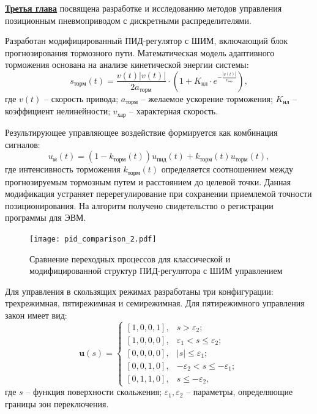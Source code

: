 \underline{\textbf{Третья глава}}
посвящена разработке и исследованию методов управления позиционным
пневмоприводом с дискретными распределителями.

Разработан модифицированный ПИД-регулятор с ШИМ, включающий блок прогнозирования
тормозного пути. Математическая модель адаптивного торможения основана на анализе кинетической энергии системы:
\begin{equation}
	s_{\text{торм}}(t) = \frac{v(t)|v(t)|}{2a_{\text{торм}}} \cdot \left(1 + K_\text{нл} \cdot e^{-\frac{|v(t)|}{v_\text{хар}}}\right),
\end{equation}
где $v(t)$ -- скорость привода;
$a_{\text{торм}}$ -- желаемое ускорение торможения;
$K_\text{нл}$ -- коэффициент нелинейности;
$v_\text{хар}$ -- характерная скорость.

Результирующее управляющее воздействие формируется как комбинация сигналов:
\begin{equation}
	u_{\text{м}}(t) = (1 - k_{\text{торм}}(t))u_{\text{пид}}(t) + k_{\text{торм}}(t)u_{\text{торм}}(t),
\end{equation}
где интенсивность торможения $k_{\text{торм}}(t)$ определяется соотношением
между прогнозируемым тормозным путем и расстоянием до целевой точки.
Данная модификация устраняет перерегулирование при сохранении приемлемой
точности позиционирования. На алгоритм получено свидетельство о регистрации программы для ЭВМ.

\begin{figure}[h]
	\centering
	\texttt{[image: pid\_comparison\_2.pdf]}
	\caption{Сравнение переходных процессов для классической и модифицированной структур ПИД-регулятора с ШИМ управлением}
\end{figure}

Для управления в скользящих режимах разработаны три конфигурации: трехрежимная, пятирежимная и семирежимная. Для пятирежимного управления закон имеет вид:
\begin{equation}
	\mathbf{u}(s) = \begin{cases}
		[1,0,0,1], & s > \varepsilon_2;                       \\
		[1,0,0,0], & \varepsilon_1 <   s \leq \varepsilon_2;  \\
		[0,0,0,0], & |s| \leq \varepsilon_1;                  \\
		[0,0,1,0], & -\varepsilon_2 <  s \leq -\varepsilon_1; \\
		[0,1,1,0], & s \leq -\varepsilon_2,
	\end{cases}
\end{equation}
где $s$ -- функция поверхности скольжения; $\varepsilon_1, \varepsilon_2$ -- параметры, определяющие границы зон переключения.

